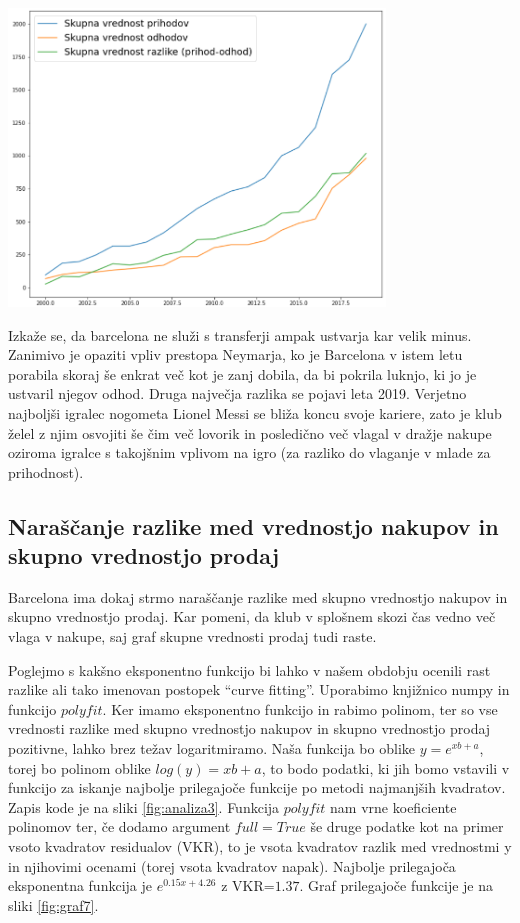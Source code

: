\documentclass[a4paper, 12pt]{article}
\begin{document}
\begin{center}
\includegraphics[width=0.75\textwidth]{graf5}
\label{fig:graf5}
\end{center}

Izkaže se, da barcelona ne služi s transferji ampak ustvarja kar velik minus.
Zanimivo je opaziti vpliv prestopa Neymarja, ko je Barcelona v istem letu porabila skoraj še enkrat več kot je zanj dobila, da bi pokrila luknjo, ki jo je ustvaril njegov odhod.
Druga največja razlika se pojavi leta 2019. Verjetno najboljši igralec nogometa Lionel Messi se bliža koncu svoje kariere, zato je klub želel z njim osvojiti še čim več lovorik in posledično več vlagal v dražje nakupe oziroma igralce s takojšnim vplivom na igro (za razliko do vlaganje v mlade za prihodnost). 

\subsection{Naraščanje razlike med vrednostjo nakupov in skupno vrednostjo prodaj}
Barcelona ima dokaj strmo naraščanje razlike med skupno vrednostjo nakupov in skupno vrednostjo prodaj. Kar pomeni, da klub v splošnem skozi čas
vedno več vlaga v nakupe, saj graf skupne vrednosti prodaj tudi raste.

Poglejmo s kakšno eksponentno funkcijo bi lahko v našem obdobju ocenili rast razlike ali tako imenovan postopek ``curve fitting''. Uporabimo knjižnico numpy in funkcijo $polyfit$. 
Ker imamo eksponentno funkcijo in rabimo polinom, ter so vse vrednosti razlike med skupno vrednostjo nakupov in skupno vrednostjo prodaj pozitivne, lahko brez težav logaritmiramo.
Naša funkcija bo oblike $y=e^{xb+a}$, torej bo polinom oblike $log(y)=xb+a$, to bodo podatki, ki jih bomo vstavili v funkcijo za iskanje najbolje prilegajoče funkcije po metodi najmanjših kvadratov. Zapis kode je na sliki \ref{fig:analiza3}. Funkcija $polyfit$ nam vrne koeficiente polinomov ter, če dodamo argument $full=True$ še druge podatke kot na primer vsoto kvadratov residualov (VKR), to je vsota kvadratov razlik med vrednostmi y in njihovimi ocenami (torej vsota kvadratov napak). 
Najbolje prilegajoča eksponentna funkcija je $e^{0.15x+4.26}$ z VKR=$1.37$. Graf prilegajoče funkcije je na sliki \ref{fig:graf7}.
\end{document}
